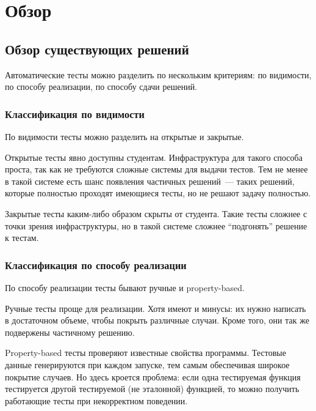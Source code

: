 
\section{Обзор}
\label{sec:relatedworks}

\subsection{Обзор существующих решений}
\label{subsec:types}

Автоматические тесты можно разделить по нескольким критериям: по видимости, по способу реализации, по способу сдачи решений.

\subsubsection{Классификация по видимости}

По видимости тесты можно разделить на открытые и закрытые.

Открытые тесты явно доступны студентам.
Инфраструктура для такого способа проста, так как не требуются сложные системы для выдачи тестов.
Тем не менее в такой системе есть шанс появления частичных решений~--- таких решений, которые полностью проходят имеющиеся тесты, но не решают задачу полностью.

Закрытые тесты каким-либо образом скрыты от студента.
Такие тесты сложнее с точки зрения инфраструктуры, но в такой системе сложнее \enquote{подгонять} решение к тестам.

\subsubsection{Классификация по способу реализации}

По способу реализации тесты бывают ручные и property-based.

Ручные тесты проще для реализации.
Хотя имеют и минусы: их нужно написать в достаточном объеме, чтобы покрыть различные случаи.
Кроме того, они так же подвержены частичному решению.

Property-based тесты проверяют известные свойства программы.
Тестовые данные генерируются при каждом запуске, тем самым обеспечивая широкое покрытие случаев.
Но здесь кроется проблема: если одна тестируемая функция тестируется другой тестируемой (не эталонной) функцией, то можно получить работающие тесты при некорректном поведении.

